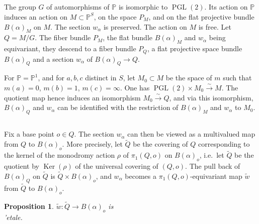 \documentclass[12pt,a4paper]{article}
\theoremstyle{plain}
\newtheorem{proposition}[theorem]{Proposition}
\theoremstyle{definition}
\theoremstyle{remark}
\DeclareMathOperator{\PGL}{PGL}
\newcommand{\PP}{\mathbb{P}}
\numberwithin{equation}{section}
\providecommand{\PP}{\mathbb{P}}
\providecommand{\PGL}{\operatorname{PGL}}
\providecommand{\Ker}{\operatorname{Ker}}
\begin{document}
\subsection{}
The group $G$ of automorphisms of $\PP$ is isomorphic to $\PGL(2)$. Its action on $\PP$ induces an action on $M \subset \PP^S$, on the space $P_M$, and on the flat projective bundle $B(\alpha)_M$ on $M$. The section $w_\alpha$ is preserved. The action on $M$ is free. Let $Q = M/G$. The fiber bundle $P_M$, the flat bundle $B(\alpha)_M$ and $w_\alpha$ being equivariant, they descend to a fiber bundle $P_Q$, a flat projective space bundle $B(\alpha)_Q$ and a section $w_\alpha$ of $B(\alpha)_Q \to Q$.

For $\PP = \PP^1$, and for $a, b, c$ distinct in $S$, let $M_0 \subset M$ be the space of $m$ such that $m(a) = 0$, $m(b) = 1$, $m(c) = \infty$. One has $\PGL(2) \times M_0 \xrightarrow{\sim} M$. The quotient map hence induces an isomorphism $M_0 \xrightarrow{\sim} Q$, and via this isomorphism, $B(\alpha)_Q$ and $w_\alpha$ can be identified with the restriction of $B(\alpha)_M$ and $w_\alpha$ to $M_0$.

\subsection{}
Fix a base point $o \in Q$. The section $w_\alpha$ can then be viewed as a multivalued map from $Q$ to $B(\alpha)_o$. More precisely, let $\widetilde{Q}$ be the covering of $Q$ corresponding to the kernel of the monodromy action $\rho$ of $\pi_1(Q, o)$ on $B(\alpha)_o$, i.e.\ let $\widetilde{Q}$ be the quotient by $\Ker(\rho)$ of the universal covering of $(Q, o)$. The pull back of $B(\alpha)_Q$ on $\widetilde{Q}$ is $\widetilde{Q} \times B(\alpha)_o$, and $w_\alpha$ becomes a $\pi_1(Q, o)$-equivariant map $\widetilde{w}$ from $\widetilde{Q}$ to $B(\alpha)_o$.

\begin{proposition}\label{prop:3.9}
$\widetilde{w}: \widetilde{Q} \to B(\alpha)_o$ is \\'etale.
\end{proposition}
\end{document}
